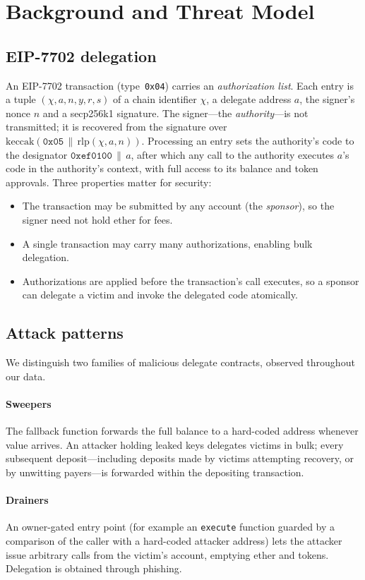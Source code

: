 \documentclass[journal]{IEEEtran}
\begin{document}
\section{Background and Threat Model}
\label{sec:background}

\subsection{EIP-7702 delegation}
An EIP-7702 transaction (type~\texttt{0x04}) carries an \emph{authorization list}. Each entry is a tuple $(\chi, a, n, y, r, s)$ of a chain identifier $\chi$, a delegate address $a$, the signer's nonce $n$ and a secp256k1 signature. The signer---the \emph{authority}---is not transmitted; it is recovered from the signature over $\mathrm{keccak}(\mathtt{0x05}\,\|\,\mathrm{rlp}(\chi, a, n))$. Processing an entry sets the authority's code to the designator $\mathtt{0xef0100}\,\|\,a$, after which any call to the authority executes $a$'s code in the authority's context, with full access to its balance and token approvals. Three properties matter for security:
\begin{itemize}
\item The transaction may be submitted by any account (the \emph{sponsor}), so the signer need not hold ether for fees.
\item A single transaction may carry many authorizations, enabling bulk delegation.
\item Authorizations are applied before the transaction's call executes, so a sponsor can delegate a victim and invoke the delegated code atomically.
\end{itemize}

\subsection{Attack patterns}
We distinguish two families of malicious delegate contracts, observed throughout our data.
\paragraph{Sweepers} The fallback function forwards the full balance to a hard-coded address whenever value arrives. An attacker holding leaked keys delegates victims in bulk; every subsequent deposit---including deposits made by victims attempting recovery, or by unwitting payers---is forwarded within the depositing transaction.
\paragraph{Drainers} An owner-gated entry point (for example an \texttt{execute} function guarded by a comparison of the caller with a hard-coded attacker address) lets the attacker issue arbitrary calls from the victim's account, emptying ether and tokens. Delegation is obtained through phishing.
\end{document}
